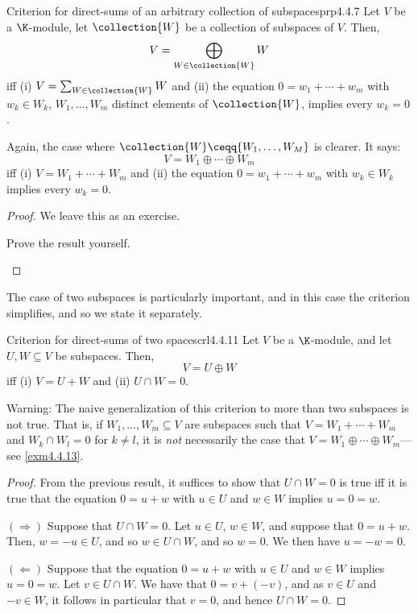 \begin{prp}{Criterion for direct-sums of an arbitrary collection of subspaces}{prp4.4.7}
	Let $V$ be a $\K$-module, let $\collection{W}$ be a collection of subspaces of $V$.  Then,
	\begin{equation}
		V=\bigoplus _{W\in \collection{W}}W
	\end{equation}
	iff (i) $V=\sum _{W\in \collection{W}}W$ and (ii) the equation $0=w_1+\cdots +w_m$ with $w_k\in W_k$, $W_1,\ldots ,W_m$ distinct elements of $\collection{W}$, implies every $w_k=0$.
	\begin{rmk}
		Again, the case where $\collection{W}\ceqq \{ W_1,\ldots ,W_M\}$ is clearer.  It says:
		\begin{equation}
			V=W_1\oplus \cdots \oplus W_m
		\end{equation}
		iff (i) $V=W_1+\cdots +W_m$ and (ii) the equation $0=w_1+\cdots +w_m$ with $w_k\in W_k$ implies every $w_k=0$.
	\end{rmk}
	\begin{proof}
		We leave this as an exercise.
		\begin{exr}[breakable=false]{}{}
			Prove the result yourself.
		\end{exr}
	\end{proof}
\end{prp}
The case of two subspaces is particularly important, and in this case the criterion simplifies, and so we state it separately.
\begin{crl}{Criterion for direct-sums of two spaces}{crl4.4.11}
	Let $V$ be a $\K$-module, and let $U,W\subseteq V$ be subspaces.  Then,
	\begin{equation}
		V=U\oplus W
	\end{equation}
	iff (i) $V=U+W$ and (ii) $U\cap W=0$.
	\begin{rmk}
		Warning:  The naive generalization of this criterion to more than two subspaces is not true.  That is, if $W_1,\ldots ,W_m\subseteq V$ are subspaces such that $V=W_1+\cdots +W_m$ and $W_k\cap W_l=0$ for $k\neq l$, it is \emph{not} necessarily the case that $V=W_1\oplus \cdots \oplus W_m$---see \cref{exm4.4.13}.
	\end{rmk}
	\begin{proof}
		From the previous result, it suffices to show that $U\cap W=0$ is true iff it is true that the equation $0=u+w$ with $u\in U$ and $w\in W$ implies $u=0=w$.
		
		\blni
		$(\Rightarrow )$ Suppose that $U\cap W=0$.  Let $u\in U$, $w\in W$, and suppose that $0=u+w$.  Then, $w=-u\in U$, and so $w\in U\cap W$, and so $w=0$.  We then have $u=-w=0$.
		
		\blni
		$(\Leftarrow )$ Suppose that the equation $0=u+w$ with $u\in U$ and $w\in W$ implies $u=0=w$.  Let $v\in U\cap W$.  We have that $0=v+(-v)$, and as $v\in U$ and $-v\in W$, it follows in particular that $v=0$, and hence $U\cap W=0$.
	\end{proof}
\end{crl}
